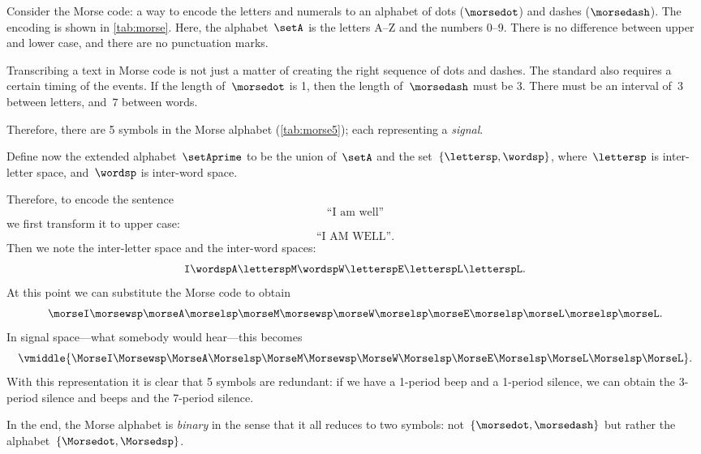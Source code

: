 \begin{example}
    \label{exa:morse-code}
    Consider the Morse code: a way to encode the letters and numerals to an alphabet of dots ($\morsedot$) and dashes ($\morsedash$).
    The encoding is shown in \cref{tab:morse}.
    Here, the alphabet~$\setA$ is the letters A--Z and the numbers 0--9.
    There is no difference between upper and lower case, and there are no punctuation marks.

    Transcribing a text in Morse code is not just a matter of creating the right sequence of dots and dashes.
    The standard also requires a certain timing of the events.
    If the length of~$\morsedot$ is 1, then the length of~$\morsedash$ must be 3.
    There must be an interval of~$3$ between letters, and~$7$ between words.

    Therefore, there are 5 symbols in the Morse alphabet (\cref{tab:morse5}); each representing a \emph{signal}.

    Define now the extended alphabet~$\setAprime$ to be the union of~$\setA$ and the set~$\{\lettersp, \wordsp\}$, where~$\lettersp$ is inter-letter space, and~$\wordsp$ is inter-word space.

    Therefore, to encode the sentence
    \begin{equation*}
        \text{``I am well''}
    \end{equation*}
    we first transform it to upper case:
    \begin{equation*}
        \text{``I AM WELL''}.
    \end{equation*}
    Then we note the inter-letter space and the inter-word spaces:
    \begin{equation*}
        \texttt{I} \wordsp \texttt{A} \lettersp \texttt{M} \wordsp \texttt{W} \lettersp
        \texttt{E} \lettersp \texttt{L} \lettersp \texttt{L}.
    \end{equation*}
    At this point we can substitute the Morse code to obtain
    \begin{equation*}
        \morseI \morsewsp \morseA \morselsp \morseM \morsewsp \morseW \morselsp \morseE \morselsp \morseL \morselsp \morseL.
    \end{equation*}
    In signal space---what somebody would hear---this becomes
    \begin{equation*}
        \vmiddle{\MorseI \Morsewsp \MorseA \Morselsp \MorseM \Morsewsp \MorseW \Morselsp \MorseE \Morselsp \MorseL \Morselsp \MorseL}.
    \end{equation*}
    With this representation it is clear that 5 symbols are redundant: if we have a 1-period beep and a 1-period silence, we can obtain the 3-period silence and beeps and the 7-period silence.

    In the end, the Morse alphabet is \emph{binary} in the sense that it all reduces to two symbols: not~$\{\morsedot, \morsedash\}$ but rather the alphabet~$\{\Morsedot, \Morsedsp\}$.
\end{example}

